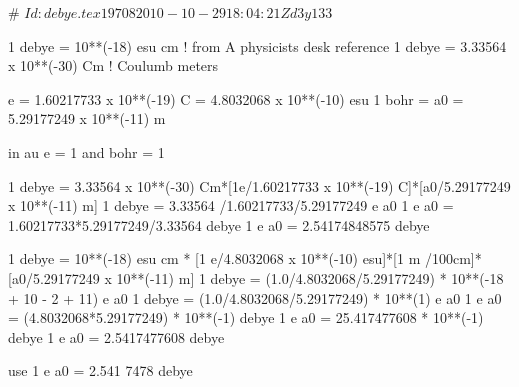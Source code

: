 # $Id: debye.tex 19708 2010-10-29 18:04:21Z d3y133 $

1 debye = 10**(-18) esu cm      ! from A physicists desk reference
1 debye = 3.33564 x  10**(-30) Cm  ! Coulumb meters



e = 1.60217733 x 10**(-19) C = 4.8032068 x 10**(-10) esu
1 bohr = a0 = 5.29177249 x 10**(-11) m

in au e = 1 and bohr = 1


1 debye = 3.33564 x 10**(-30) Cm*[1e/1.60217733 x 10**(-19) C]*[a0/5.29177249 x 10**(-11) m]
1 debye = 3.33564 /1.60217733/5.29177249 e a0
1 e a0 = 1.60217733*5.29177249/3.33564 debye
1 e a0 = 2.54174848575 debye


1 debye = 10**(-18) esu cm * [1 e/4.8032068 x 10**(-10) esu]*[1 m /100cm]*[a0/5.29177249 x 10**(-11) m]
1 debye = (1.0/4.8032068/5.29177249) * 10**(-18 + 10 - 2 + 11) e a0
1 debye = (1.0/4.8032068/5.29177249) * 10**(1) e a0
1 e a0  = (4.8032068*5.29177249) * 10**(-1) debye
1 e a0  = 25.417477608 * 10**(-1) debye
1 e a0  = 2.5417477608 debye

use 1 e a0 = 2.541 7478 debye
